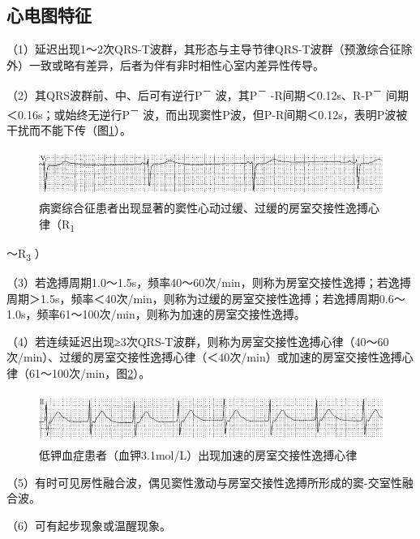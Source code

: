 \protect\hypertarget{text00019.htmlux5cux23subid182}{}{}

\subsection{心电图特征}

（1）延迟出现1～2次QRS-T波群，其形态与主导节律QRS-T波群（预激综合征除外）一致或略有差异，后者为伴有非时相性心室内差异性传导。

（2）其QRS波群前、中、后可有逆行P\textsuperscript{－}
波，其P\textsuperscript{－} -R间期＜0.12s、R-P\textsuperscript{－}
间期＜0.16s；或始终无逆行P\textsuperscript{－}
波，而出现窦性P波，但P-R间期＜0.12s，表明P波被干扰而不能下传（图\ref{fig12-5}）。

\begin{figure}[!htbp]
 \centering
 \includegraphics[width=5.58333in,height=0.60417in]{./images/Image00198.jpg}
 \captionsetup{justification=centering}
 \caption{病窦综合征患者出现显著的窦性心动过缓、过缓的房室交接性逸搏心律（R\textsubscript{1}}
 \label{fig12-5}
  \end{figure} 
～R\textsubscript{3} ）

（3）若逸搏周期1.0～1.5s，频率40～60次/min，则称为房室交接性逸搏；若逸搏周期＞1.5s，频率＜40次/min，则称为过缓的房室交接性逸搏；若逸搏周期0.6～1.0s，频率61～100次/min，则称为加速的房室交接性逸搏。

（4）若连续延迟出现≥3次QRS-T波群，则称为房室交接性逸搏心律（40～60次/min）、过缓的房室交接性逸搏心律（＜40次/min）或加速的房室交接性逸搏心律（61～100次/min，图\ref{fig12-6}）。

\begin{figure}[!htbp]
 \centering
 \includegraphics[width=5.58333in,height=0.65625in]{./images/Image00199.jpg}
 \captionsetup{justification=centering}
 \caption{低钾血症患者（血钾3.1mol/L）出现加速的房室交接性逸搏心律}
 \label{fig12-6}
  \end{figure} 

（5）有时可见房性融合波，偶见窦性激动与房室交接性逸搏所形成的窦-交室性融合波。

（6）可有起步现象或温醒现象。

